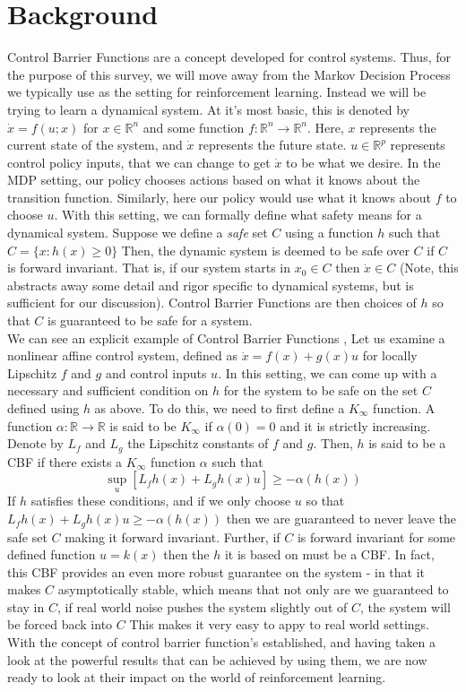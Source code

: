\documentclass{article}
\newcommand{\R}{\ensuremath{\mathbb{R}}}
\begin{document}
\section{Background}
Control Barrier Functions are a concept developed for control systems. Thus, for the purpose of this survey, we will move away from the Markov Decision Process we typically use as the setting for reinforcement learning. Instead we will be trying to learn a dynamical system. At it's most basic, this is denoted by $\dot{x} = f(u; x)$ for $x \in \R^n$ and some function $f: \R^n \rightarrow \R^n$. Here, $x$ represents the current state of the system, and $\dot{x}$ represents the future state. $u \in \R^p$ represents control policy inputs, that we can change to get $\dot{x}$ to be what we desire. In the MDP setting, our policy chooses actions based on what it knows about the transition function. Similarly, here our policy would use what it knows about $f$ to choose $u$. With this setting, we can formally define what safety means for a dynamical system. Suppose we define a \textit{safe} set $C$ using a function $h$ such that $C = \{x : h(x) \geq 0\}$ Then, the dynamic system is deemed to be safe over $C$ if $C$ is forward invariant. That is, if our system starts in $x_0 \in C$ then $\dot{x} \in C$ (Note, this abstracts away some detail and rigor specific to dynamical systems, but is sufficient for our discussion). Control Barrier Functions are then choices of $h$ so that $C$ is guaranteed to be safe for a system. \\
We can see an explicit example of Control Barrier Functions \cite{ames2019control}, Let us examine a nonlinear affine control system, defined as $\dot{x} = f(x) + g(x)u$ for locally Lipschitz $f$ and $g$ and control inputs $u$. In this setting, we can come up with a necessary and sufficient condition on $h$ for the system to be safe on the set $C$ defined using $h$ as above. To do this, we need to first define a $K_\infty$ function. A function $\alpha : \R \rightarrow \R$ is said to be $K_\infty$ if $\alpha(0) = 0$ and it is strictly increasing. Denote by $L_f$ and $L_g$ the Lipschitz constants of $f$ and $g$. Then, $h$ is said to be a CBF if there exists a $K_\infty$ function $\alpha$ such that \begin{equation}
    \sup_u [L_fh(x) + L_gh(x)u] \geq -\alpha(h(x))
\end{equation} If $h$ satisfies these conditions, and if we only choose $u$ so that $L_fh(x) + L_gh(x)u \geq -\alpha(h(x))$ then we are guaranteed to never leave the safe set $C$ making it forward invariant. Further, if $C$ is forward invariant for some defined function $u = k(x)$ then the $h$ it is based on must be a CBF. In fact, this CBF provides an even more robust guarantee on the system - in that it makes $C$ asymptotically stable, which means that not only are we guaranteed to stay in $C$, if real world noise pushes the system slightly out of $C$, the system will be forced back into $C$ \cite{ames2016control} This makes it very easy to appy to real world settings. With the concept of control barrier function's established, and having taken a look at the powerful results that can be achieved by using them, we are now ready to look at their impact on the world of reinforcement learning.
\end{document}
